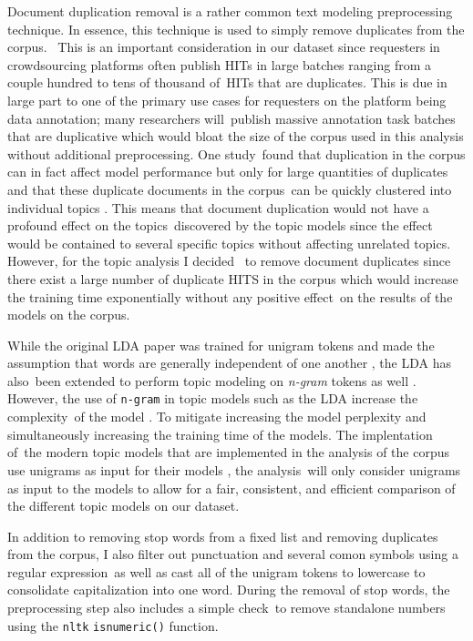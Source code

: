 \documentclass[letterpaper,12pt]{article}
\begin{document}
Document duplication removal is a rather common text modeling preprocessing technique. In essence, this technique is used to simply remove duplicates from the corpus. \
This is an important consideration in our dataset since requesters in crowdsourcing platforms often publish HITs in large batches ranging from a couple hundred to tens of thousand of\
HITs that are duplicates. This is due in large part to one of the primary use cases for requesters on the platform being data annotation; many researchers will\
publish massive annotation task batches that are duplicative which would bloat the size of the corpus used in this analysis without additional preprocessing. One study\
found that duplication in the corpus can in fact affect model performance but only for large quantities of duplicates and that these duplicate documents in the corpus\
can be quickly clustered into individual topics \cite{schofieldunderstanding}. This means that document duplication would not have a profound effect on the topics\
discovered by the topic models since the effect would be contained to several specific topics without affecting unrelated topics. However, for the topic analysis I decided \
to remove document duplicates since there exist a large number of duplicate HITS in the corpus which would increase the training time exponentially without any positive effect\
on the results of the models on the corpus.

While the original LDA paper was trained for unigram tokens and made the assumption that words are generally independent of one another \cite{blei2003latent}, the LDA has also\
been extended to perform topic modeling on \emph{n-gram} tokens as well \cite{wang2005note}. However, the use of \texttt{n-gram} in topic models such as the LDA increase the complexity\
of the model \cite{wang2007topical}. To mitigate increasing the model perplexity and simultaneously increasing the training time of the models. The implentation of\
the modern topic models that are implemented in the analysis of the corpus use unigrams as input for their models \cite{moody2016mixing}\cite{dieng2019topic}, the analysis\
will only consider unigrams as input to the models to allow for a fair, consistent, and efficient comparison of the different topic models on our dataset.

In addition to removing stop words from a fixed list and removing duplicates from the corpus, I also filter out punctuation and several comon symbols using a regular expression\
as well as cast all of the unigram tokens to lowercase to consolidate capitalization into one word. During the removal of stop words, the preprocessing step also includes a simple check\
to remove standalone numbers using the \texttt{nltk} \cite{loper2002nltk} \texttt{isnumeric()} function.
\end{document}
